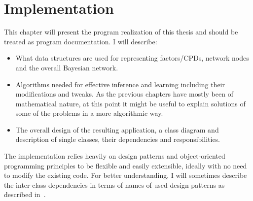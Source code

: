 \documentclass[english,cover]{fitthesis} %
\begin{document}

\chapter{Implementation}
This chapter will present the program realization of this thesis and should be treated as program documentation. I will describe:
\begin{itemize}
	\item What data structures are used for representing factors/CPDs, network nodes and the overall Bayesian network.
	\item Algorithms needed for effective inference and learning including their modifications and tweaks. As the previous chapters have mostly been of mathematical nature, at this point it might be useful to explain solutions of some of the problems in a more algorithmic way.
	\item The overall design of the resulting application, a class diagram and description of single classes, their dependencies and responsibilities.
\end{itemize}
The implementation relies heavily on design patterns and object-oriented programming principles to be flexible and easily extensible, ideally with no need to modify the existing code. For better understanding, I will sometimes describe the inter-class dependencies in terms of names of used design patterns as described in~\cite{head_first_design_patterns}.
\end{document}
